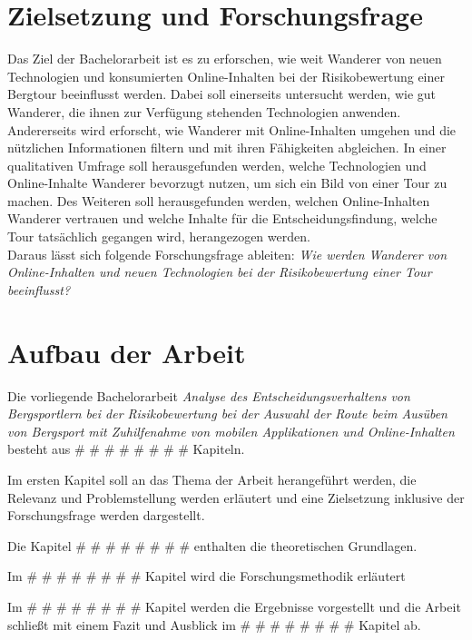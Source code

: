 \section{Zielsetzung und Forschungsfrage}


Das Ziel der Bachelorarbeit ist es zu erforschen, wie weit  Wanderer von neuen Technologien und konsumierten Online-Inhalten bei der Risikobewertung einer Bergtour beeinflusst werden. Dabei soll einerseits untersucht werden, wie gut Wanderer, die ihnen zur Verfügung stehenden Technologien anwenden. Andererseits wird erforscht, wie Wanderer mit Online-Inhalten umgehen und die nützlichen Informationen filtern und mit ihren Fähigkeiten abgleichen. In einer qualitativen Umfrage soll herausgefunden werden, welche Technologien und Online-Inhalte Wanderer bevorzugt nutzen, um sich ein Bild von einer Tour zu machen. Des Weiteren soll herausgefunden werden, welchen Online-Inhalten Wanderer vertrauen und welche Inhalte für die Entscheidungsfindung, welche Tour tatsächlich gegangen wird, herangezogen werden.\\
Daraus lässt sich folgende Forschungsfrage ableiten: 
\textit{Wie werden Wanderer von Online-Inhalten und neuen Technologien bei der Risikobewertung einer Tour beeinflusst?}

\section{Aufbau der Arbeit}

Die vorliegende Bachelorarbeit \textit{Analyse des Entscheidungsverhaltens von Bergsportlern bei der Risikobewertung bei der Auswahl der Route beim Ausüben von Bergsport mit Zuhilfenahme von mobilen Applikationen und Online-Inhalten} besteht aus \# \# \# \# \# \# \# \# Kapiteln.\par

Im ersten Kapitel soll an das Thema der Arbeit herangeführt werden, die Relevanz und Problemstellung werden erläutert und eine Zielsetzung inklusive der Forschungsfrage werden dargestellt.\par

Die Kapitel \# \# \# \# \# \# \# \# enthalten die theoretischen Grundlagen.\par

Im \# \# \# \# \# \# \# \# Kapitel wird die Forschungsmethodik erläutert\par

Im \# \# \# \# \# \# \# \# Kapitel werden die Ergebnisse vorgestellt und die Arbeit schließt mit einem Fazit und Ausblick im \# \# \# \# \# \# \# \# Kapitel ab.

